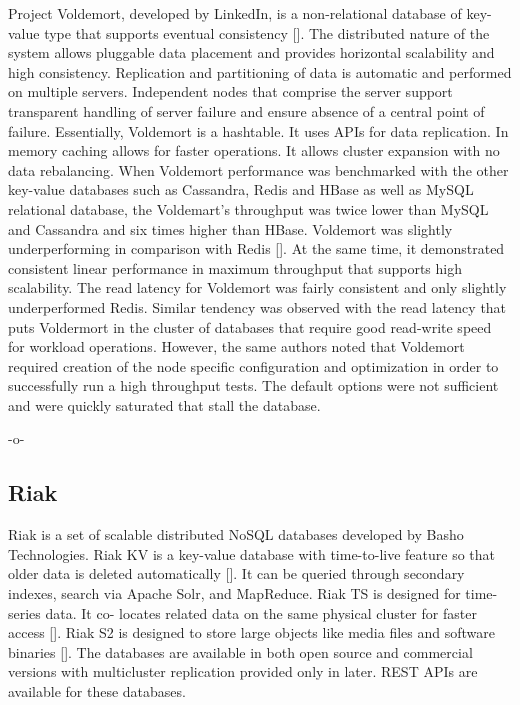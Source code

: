 Project Voldemort, developed by LinkedIn, is a non-relational database
of key-value type that supports eventual
consistency [\cite{www-voldemort}].  The distributed nature of the
system allows pluggable data placement and provides horizontal
scalability and high consistency. Replication and partitioning of data
is automatic and performed on multiple servers. Independent nodes that
comprise the server support transparent handling of server failure and
ensure absence of a central point of failure. Essentially, Voldemort
is a hashtable. It uses APIs for data replication. In memory caching
allows for faster operations. It allows cluster expansion with no data
rebalancing.  When Voldemort performance was benchmarked with the
other key-value databases such as Cassandra, Redis and HBase as well
as MySQL relational database, the Voldemart's throughput was twice
lower than MySQL and Cassandra and six times higher than
HBase. Voldemort was slightly underperforming in comparison with
Redis [\cite{rabl-sadoghi-jacobsen-2012}].  At the same time, it
demonstrated consistent linear performance in maximum throughput that
supports high scalability. The read latency for Voldemort was fairly
consistent and only slightly underperformed Redis. Similar tendency
was observed with the read latency that puts Voldermort in the cluster
of databases that require good read-write speed for workload
operations. However, the same authors noted that Voldemort required
creation of the node specific configuration and optimization in order
to successfully run a high throughput tests. The default options were
not sufficient and were quickly saturated that stall the database.

     -o-
     
\subsection{Riak}

Riak is a set of scalable distributed NoSQL databases developed by
Basho Technologies. Riak KV is a key-value database with time-to-live
feature so that older data is deleted
automatically [\cite{www-riak-kv}].  It can be queried through secondary
indexes, search via Apache Solr, and MapReduce. Riak TS is designed
for time-series data. It co- locates related data on the same physical
cluster for faster access [\cite{www-riak-ts}]. Riak S2 is designed to
store large objects like media files and software
binaries [\cite{www-riak-s2}]. The databases are available in both open
source and commercial versions with multicluster replication provided
only in later. REST APIs are available for these databases.

